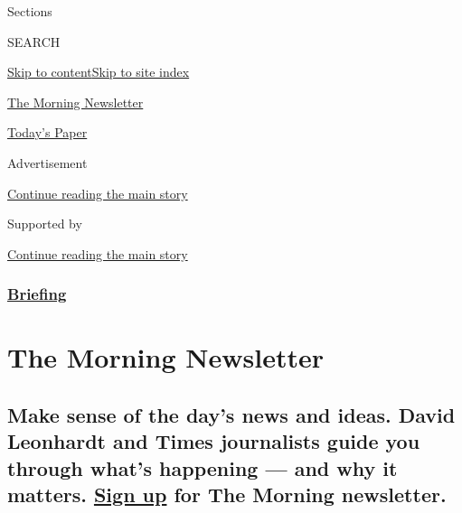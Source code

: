 Sections

SEARCH

\protect\hyperlink{site-content}{Skip to
content}\protect\hyperlink{site-index}{Skip to site index}

\href{https://www.nytimes.com/series/us-morning-briefing}{The Morning
Newsletter}

\href{https://myaccount.nytimes.com/auth/login?response_type=cookie\&client_id=vi}{}

\href{https://www.nytimes.com/section/todayspaper}{Today's Paper}

Advertisement

\protect\hyperlink{after-top}{Continue reading the main story}

Supported by

\protect\hyperlink{after-sponsor}{Continue reading the main story}

\hypertarget{briefing}{%
\subsubsection{\texorpdfstring{\href{/interactive/2018/briefing/global-morning-briefing-newsletter-signup.html}{Briefing}}{Briefing}}\label{briefing}}

\hypertarget{the-morning-newsletter}{%
\section{The Morning Newsletter}\label{the-morning-newsletter}}

\hypertarget{make-sense-of-the-days-news-and-ideas-david-leonhardt-and-times-journalists-guide-you-through-whats-happening--and-why-it-matters-sign-up-for-the-morning-newsletter}{%
\subsection{\texorpdfstring{Make sense of the day's news and ideas.
David Leonhardt and Times journalists guide you through what's happening
--- and why it matters.
\href{https://www.nytimes.com/newsletters/morning-briefing}{Sign up} for
The Morning
newsletter.}{Make sense of the day's news and ideas. David Leonhardt and Times journalists guide you through what's happening --- and why it matters. Sign up for The Morning newsletter.}}\label{make-sense-of-the-days-news-and-ideas-david-leonhardt-and-times-journalists-guide-you-through-whats-happening--and-why-it-matters-sign-up-for-the-morning-newsletter}}

